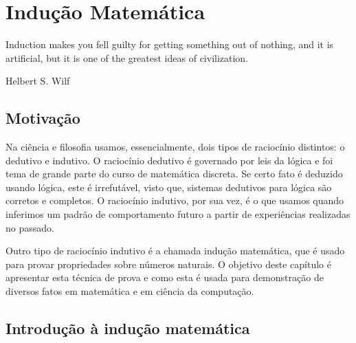 \chapter{Indução Matemática}\label{cap9}

\epigraph{Induction makes you fell guilty for getting something out of
nothing, and it is artificial, but it is one of the greatest ideas of
civilization.}{Helbert S. Wilf}

\section{Motivação}

Na ciência e filosofia usamos, essencialmente, dois tipos de
raciocínio distintos: o dedutivo e indutivo. O raciocínio dedutivo é
governado por leis da lógica e foi tema de grande parte do curso de
matemática discreta. Se certo fato é deduzido usando lógica, este é
irrefutável, visto que, sistemas dedutivos para lógica são corretos e
completos. O raciocínio indutivo, por sua vez, é o que usamos quando
inferimos um padrão de comportamento futuro a partir de experiências
realizadas no passado.

Outro tipo de raciocínio indutivo é a chamada indução matemática, que
é usado para provar propriedades sobre números naturais. O objetivo
deste capítulo é apresentar esta técnica de prova e como esta é usada
para demonstração de diversos fatos em matemática e em ciência da
computação.


\section{Introdução à indução matemática}

